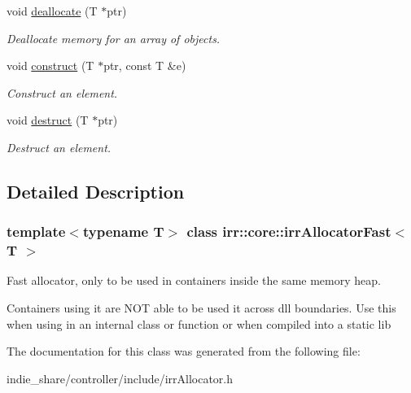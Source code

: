 \begin{DoxyCompactItemize}
\mbox{\label{classirr_1_1core_1_1irrAllocatorFast_aa3d0f4fadf4e330abe277ba3f639bb07}} 
void \hyperlink{classirr_1_1core_1_1irrAllocatorFast_aa3d0f4fadf4e330abe277ba3f639bb07}{deallocate} (T $\ast$ptr)
\begin{DoxyCompactList}\small\item\em Deallocate memory for an array of objects. \end{DoxyCompactList}\item 
\mbox{\label{classirr_1_1core_1_1irrAllocatorFast_a0cadba66801009a1118d7046615c8e04}} 
void \hyperlink{classirr_1_1core_1_1irrAllocatorFast_a0cadba66801009a1118d7046615c8e04}{construct} (T $\ast$ptr, const T \&e)
\begin{DoxyCompactList}\small\item\em Construct an element. \end{DoxyCompactList}\item 
\mbox{\label{classirr_1_1core_1_1irrAllocatorFast_a4249f5cde51abf01a25ab53dc173646d}} 
void \hyperlink{classirr_1_1core_1_1irrAllocatorFast_a4249f5cde51abf01a25ab53dc173646d}{destruct} (T $\ast$ptr)
\begin{DoxyCompactList}\small\item\em Destruct an element. \end{DoxyCompactList}\end{DoxyCompactItemize}


\subsection{Detailed Description}
\subsubsection*{template$<$typename T$>$\newline
class irr\+::core\+::irr\+Allocator\+Fast$<$ T $>$}

Fast allocator, only to be used in containers inside the same memory heap. 

Containers using it are N\+OT able to be used it across dll boundaries. Use this when using in an internal class or function or when compiled into a static lib 

The documentation for this class was generated from the following file\+:\begin{DoxyCompactItemize}
\item 
indie\+\_\+share/controller/include/irr\+Allocator.\+h\end{DoxyCompactItemize}
